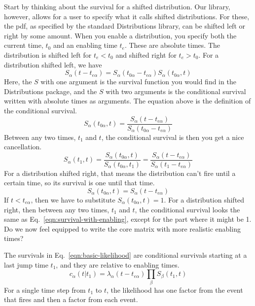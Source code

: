 \documentclass{article}
\begin{document}
Start by thinking about the survival for a shifted distribution. Our library, however, allows for a user to specify what it calls shifted distributions. For these, the pdf, as specified by the standard Distributions library, can be shifted left or right by some amount. When you enable a distribution, you specify both the current time, $t_0$ and an enabling time $t_e$. These are absolute times. The distribution is shifted left for $t_e<t_0$ and shifted right for $t_e>t_0$. For a distribution shifted left, we have
\begin{equation}
	S_{\alpha}(t-t_{e\alpha}) = S_{\alpha}(t_{0\alpha} - t_{e\alpha})S_{\alpha}(t_{0\alpha}, t)
\end{equation}
Here, the $S$ with one argument is the survival function you would find in the Distributions package, and the $S$ with two arguments is the conditional survival written with absolute times as arguments. The equation above is the definition of the conditional survival.
\begin{equation}
	S_{\alpha}(t_{0\alpha}, t) =  \frac{S_{\alpha}(t-t_{e\alpha})}{S_{\alpha}(t_{0\alpha} - t_{e\alpha})}
\end{equation}
Between any two times, $t_1$ and $t$, the conditional survival is then you get a nice cancellation.
\begin{equation}
	S_{\alpha}(t_{1}, t) = \frac{S_{\alpha}(t_{0\alpha}, t)}{S_{\alpha}(t_{0\alpha}, t_1)}
	= \frac{S_{\alpha}(t-t_{e\alpha})}{S_{\alpha}(t_1-t_{e\alpha})}\label{eqn:survival-with-enabling}
\end{equation}
For a distribution shifted right, that means the distribution can't fire until a certain time, so its survival is one until that time.
\begin{equation}
	S_{\alpha}(t_{0\alpha}, t) =  S_{\alpha}(t - t_{e\alpha})
\end{equation}
If $t<t_{e\alpha}$, then we have to substitute $S_{\alpha}(t_{0\alpha}, t)=1$. For a distribution shifted right, then between any two times, $t_1$ and $t$, the conditional survival looks the same as Eq.~\ref{eqn:survival-with-enabling}, except for the part where it might be 1. Do we now feel equipped to write the core matrix with more realistic enabling times?


The survivals in Eq.~\ref{eqn:basic-likelihood} are conditional survivals starting at a last jump time $t_1$, and they are relative to enabling times.
\begin{equation}
	c_{\alpha}(t|t_1) = \lambda_{\alpha}(t-t_{e\alpha})\prod_\beta S_{\beta}(t_1,t)
\end{equation}
For a single time step from $t_1$ to $t$, the likelihood has one factor from the event that fires and then a factor from each event.
\end{document}
